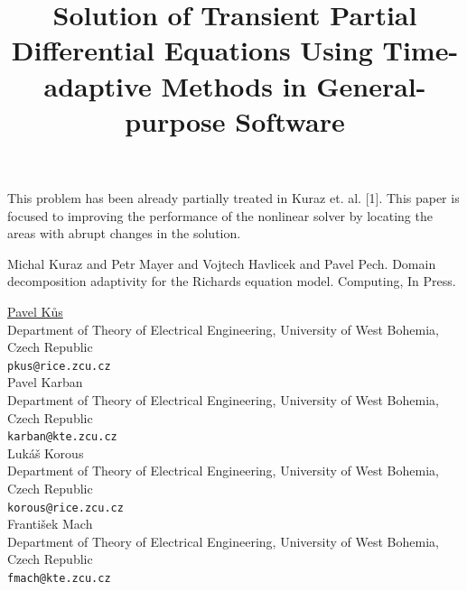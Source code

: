 \documentclass[article, A4, 11pt]{llncs}%
\begin{document}
This problem has been already partially treated in Kuraz et. al. [1]. This paper is focused to improving the performance of the nonlinear solver by locating the areas with  abrupt changes in the solution.



\begin{thebibliography}{10}
{\sc Michal Kuraz and Petr Mayer and Vojtech Havlicek and Pavel Pech}. {Domain decomposition adaptivity for the Richards equation model}. Computing, In Press.
\end{thebibliography} %

\title{Solution of Transient Partial Differential Equations Using Time-adaptive Methods in General-purpose Software}
 \author{} \institute{}
\maketitle
\begin{center}
{\large \underline{Pavel  Kůs}}\\
Department of Theory of Electrical Engineering, University of West Bohemia, Czech Republic\\
{\tt pkus@rice.zcu.cz}
\\ \vspace{4mm}
{\large Pavel Karban}\\
Department of Theory of Electrical Engineering, University of West Bohemia, Czech Republic\\
{\tt karban@kte.zcu.cz}
\\ \vspace{4mm}
{\large Lukáš Korous}\\
Department of Theory of Electrical Engineering, University of West Bohemia, Czech Republic\\
{\tt korous@rice.zcu.cz}
\\ \vspace{4mm}
{\large František Mach}\\
Department of Theory of Electrical Engineering, University of West Bohemia, Czech Republic\\
{\tt fmach@kte.zcu.cz}
\end{center}
\end{document}
